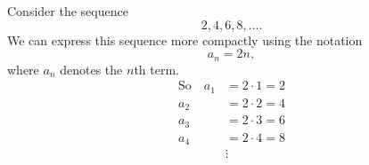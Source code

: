 \begin{frame}
\begin{example}
Consider the sequence
\[
2, 4, 6, 8, \ldots.
\]
We can express this sequence more compactly using the notation
\[
a_n = 2n,
\]
where $a_n$ denotes the $n$th term.  
\begin{align*}
\text{So} \quad a_1 & = 2\cdot 1 = 2 \\
a_2 & = 2\cdot 2 = 4 \\
a_3 & = 2\cdot 3 = 6 \\
a_4 & = 2\cdot 4 = 8 \\
 & \vdots
\end{align*}
\end{example}

\end{frame}
